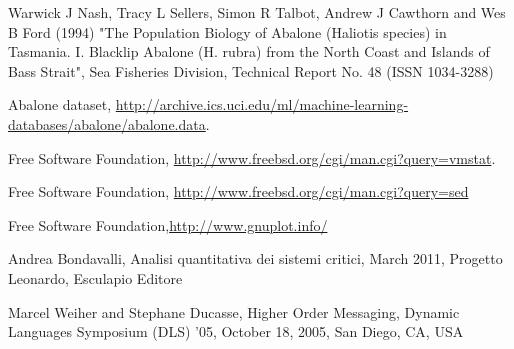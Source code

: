 \documentclass[10pt,a4paper]{article}
\begin{document}
    \begin{thebibliography}{9}

    Warwick J Nash, Tracy L Sellers, Simon R Talbot, Andrew J Cawthorn and
        Wes B Ford (1994) "The Population Biology of Abalone (Haliotis
            species) in Tasmania. I. Blacklip Abalone (H. rubra) from the North
                Coast and Islands of Bass Strait", Sea Fisheries Division, Technical
                    Report No. 48 (ISSN 1034-3288)


      Abalone dataset,
      \url{http://archive.ics.uci.edu/ml/machine-learning-databases/abalone/abalone.data}.

      Free Software Foundation,
      \url{http://www.freebsd.org/cgi/man.cgi?query=vmstat}.

      Free Software Foundation,
      \url{http://www.freebsd.org/cgi/man.cgi?query=sed}

     Free Software
      Foundation,\url{http://www.gnuplot.info/}

     Andrea Bondavalli, Analisi quantitativa dei
      sistemi critici, March 2011, Progetto Leonardo, Esculapio
      Editore

     Marcel Weiher and Stephane Ducasse,
      Higher Order Messaging, Dynamic Languages Symposium (DLS) '05,
      October 18, 2005, San Diego, CA, USA


    \end{thebibliography}
\end{document}
